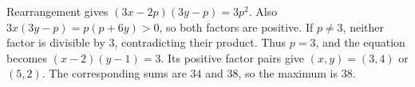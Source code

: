 Rearrangement gives $(3x-2p)(3y-p)=3p^2$. Also $3x(3y-p)=p(p+6y)>0$, so both factors are positive. If $p\ne3$, neither factor is divisible by $3$, contradicting their product. Thus $p=3$, and the equation becomes $(x-2)(y-1)=3$. Its positive factor pairs give $(x,y)=(3,4)$ or $(5,2)$. The corresponding sums are $34$ and $38$, so the maximum is $\boxed{38}$.
